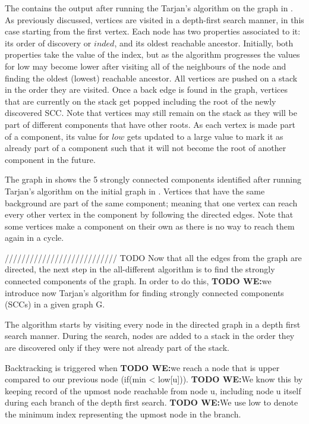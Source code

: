 \documentclass{l4proj}
\begin{document}
\noindent The  contains the output after running the Tarjan’s algorithm on the graph in . As previously discussed, vertices are visited in a depth-first search manner, in this case starting from the first vertex. Each node has two properties associated to it: its order of discovery or $inded$, and its oldest reachable ancestor. Initially, both properties take the value of the index, but as the algorithm progresses the values for low may become lower after visiting all of the neighbours of the node and finding the oldest (lowest) reachable ancestor. All vertices are pushed on a stack in the order they are visited. Once a back edge is found in the graph, vertices that are currently on the stack get popped including the root of the newly discovered SCC. Note that vertices may still remain on the stack as they will be part of different components that have other roots. As each vertex is made part of a component, its value for $low$ gets updated to a large value to mark it as already part of a component such that it will not become the root of another component in the future.

\noindent The graph in  shows the 5 strongly connected components identified after running Tarjan’s algorithm on the initial graph in . Vertices that have the same background are part of the same component; meaning that one vertex can reach every other vertex in the component by following the directed edges. Note that some vertices make a component on their own as there is no way to reach them again in a cycle.

\iffalse /////////////////////////// TODO
Now that all the edges from the graph are directed, the next step in the all-different algorithm is to find the strongly connected components of the graph. In order to do this, \textbf{TODO WE:}we introduce now Tarjan’s algorithm for finding strongly connected components  (SCCs) in a given graph G.

\noindent The algorithm starts by visiting every node in the directed graph in a depth first search manner. During the search, nodes are added to a stack in the order they are discovered only if they were not already part of the stack. 

\noindent Backtracking is triggered when \textbf{TODO WE:}we reach a node that is upper compared to our previous node (if(min < low[u])).  \textbf{TODO WE:}We know this by keeping record of the upmost node reachable from node u, including node u itself during each branch of the depth first search. \textbf{TODO WE:}We use low to denote the minimum index representing the upmost node in the branch.
\end{document}
